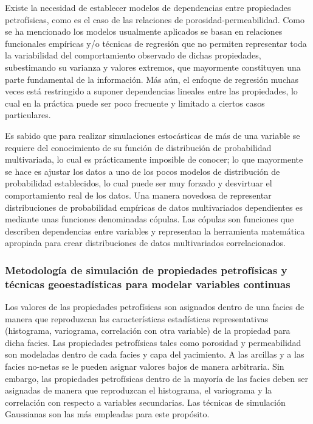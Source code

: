 Existe la necesidad de establecer modelos de dependencias entre propiedades petrof\'isicas, como es el caso de las relaciones de porosidad-permeabilidad. Como se ha mencionado los modelos usualmente aplicados se basan en relaciones funcionales emp\'iricas y/o t\'ecnicas de regresi\'on que no permiten representar toda la variabilidad del comportamiento observado de dichas propiedades, subestimando su varianza y valores extremos, que mayormente constituyen una parte fundamental de la informaci\'on. M\'as a\'un, el enfoque de regresi\'on muchas veces est\'a restringido a suponer dependencias lineales entre las propiedades, lo cual en la pr\'actica puede ser poco frecuente y limitado a ciertos casos particulares.

Es sabido que para realizar simulaciones estoc\'asticas de m\'as de una variable se requiere del conocimiento de su funci\'on de distribuci\'on de probabilidad multivariada, lo cual es pr\'acticamente imposible de conocer; lo que mayormente se hace es ajustar los datos a uno de los pocos modelos de distribuci\'on de probabilidad establecidos, lo cual puede ser muy forzado y desvirtuar el comportamiento real de los datos. Una manera novedosa de representar distribuciones de probabilidad emp\'iricas de datos multivariados dependientes es mediante unas funciones denominadas c\'opulas. Las c\'opulas son funciones que describen dependencias entre variables y representan la herramienta matem\'atica apropiada para crear distribuciones de datos multivariados correlacionados.

\subsubsection{Metodolog\'ia de simulaci\'on de propiedades petrof\'isicas y t\'ecnicas geoestad\'isticas para modelar variables continuas}

Los valores de las propiedades petrof\'isicas son asignados dentro de una facies de manera que reproduzcan las caracter\'isticas estad\'isticas representativas (histograma, variograma, correlaci\'on con otra variable) de la propiedad para dicha facies. Las propiedades petrof\'isicas tales como porosidad y permeabilidad son modeladas dentro de cada facies y capa del yacimiento. A las arcillas y a las facies no-netas se le pueden asignar valores bajos de manera arbitraria. Sin embargo, las propiedades petrof\'isicas dentro de la mayor\'ia de las facies deben ser asignadas de manera que reproduzcan el histograma, el variograma y la correlaci\'on con respecto a variables secundarias. Las t\'ecnicas de simulaci\'on Gaussianas son las m\'as empleadas para este prop\'osito.

